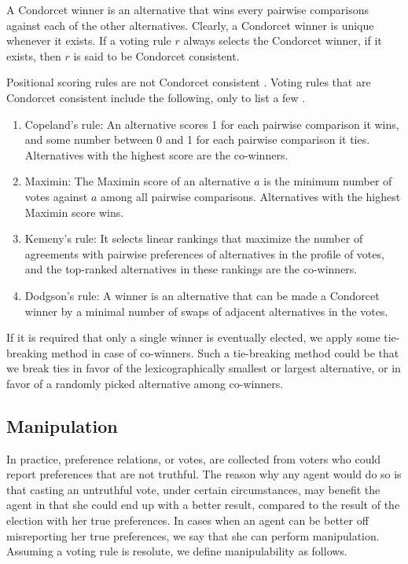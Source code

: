 A Condorcet winner is an alternative that wins every pairwise comparisons
against each of the other alternatives.
Clearly, a Condorcet winner is unique whenever it exists.
If a voting rule $r$ always selects the Condorcet winner,
if it exists, then $r$ is said to be Condorcet consistent.

Positional scoring rules are not Condorcet consistent \cite{Fis}.
Voting rules that are Condorcet consistent include the following,
only to list a few \cite{Brandt:COMSOC}.
\begin{enumerate} \itemsep -4pt
	\item Copeland's rule: An alternative scores 1 for each pairwise comparison
				it wins, and some number between 0 and 1 for each pairwise comparison
				it ties.  Alternatives with the highest score are the co-winners.
	\item Maximin: The Maximin score of an alternative $a$ is the minimum number of
				votes against $a$ among all pairwise comparisons.  
				Alternatives with the highest Maximin score wins.
	\item Kemeny's rule: It selects linear rankings that maximize the number of agreements 
				with pairwise preferences of alternatives in the profile of votes, and
				the top-ranked alternatives in these rankings are the co-winners.
	\item Dodgson's rule: A winner is an alternative that can be made a Condorcet winner 
				by a minimal number of swaps of adjacent alternatives in the votes.
\end{enumerate}

If it is required that only a single winner is eventually elected,
we apply some tie-breaking method in case of co-winners.
Such a tie-breaking method could be that we break ties in favor of
the lexicographically smallest or largest alternative, or in favor of
a randomly picked alternative among co-winners.







\subsection{Manipulation \label{sec:manip}}
In practice, preference relations, or votes, are collected from voters
who could report preferences that are not truthful.
The reason why any agent would do so is that
casting an untruthful vote, under certain circumstances,
may benefit the agent in that she could end up with
a better result, compared to the result of the election
with her true preferences.
In cases when an agent can be better off misreporting her
true preferences, we say that she can perform manipulation.
Assuming a voting rule is resolute,
we define manipulability as follows.

